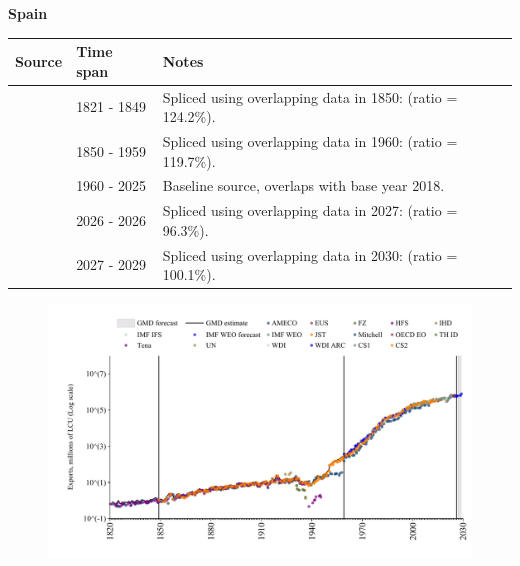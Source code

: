 \documentclass[12pt,a4paper,landscape]{article}
\begin{document}
\begin{adjustbox}{max totalsize={\paperwidth}{\paperheight},center}
\begin{minipage}[t][\textheight][t]{\textwidth}
\vspace*{0.5cm}
{}
\begin{center}
{\Large\bfseries Spain}
\end{center}
\vspace{0.5cm}
\begin{table}[H]
\centering
\small
\begin{tabular}{|l|l|l|}
\hline
\textbf{Source} & \textbf{Time span} & \textbf{Notes} \\
\hline
\rowcolor{white}\cite{Tena}& 1821 - 1849 &Spliced using overlapping data in 1850: (ratio = 124.2\%).\\
\rowcolor{lightgray}\cite{CS2_ESP}& 1850 - 1959 &Spliced using overlapping data in 1960: (ratio = 119.7\%).\\
\rowcolor{white}\cite{OECD_EO}& 1960 - 2025 &Baseline source, overlaps with base year 2018.\\
\rowcolor{lightgray}\cite{AMECO}& 2026 - 2026 &Spliced using overlapping data in 2027: (ratio = 96.3\%).\\
\rowcolor{white}\cite{IMF_WEO_forecast}& 2027 - 2029 &Spliced using overlapping data in 2030: (ratio = 100.1\%).\\
\hline
\end{tabular}
\end{table}
\begin{figure}[H]
\centering
\includegraphics[width=\textwidth,height=0.6\textheight,keepaspectratio]{graphs/ESP_exports.pdf}
\end{figure}
\end{minipage}
\end{adjustbox}
\end{document}
